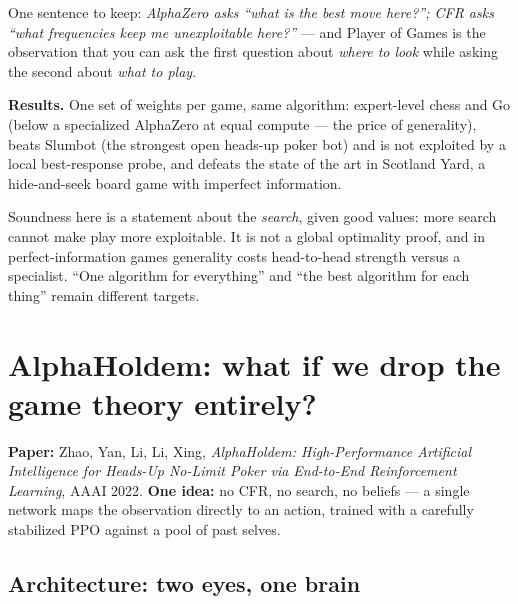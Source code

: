 \documentclass[11pt,a4paper]{article}
\begin{document}
\begin{intuition}
One sentence to keep: \emph{AlphaZero asks ``what is the best move here?'';
CFR asks ``what frequencies keep me unexploitable here?''} --- and Player of
Games is the observation that you can ask the first question about
\emph{where to look} while asking the second about \emph{what to play}.
\end{intuition}

\textbf{Results.} One set of weights per game, same algorithm: expert-level
chess and Go (below a specialized AlphaZero at equal compute --- the price of
generality), beats Slumbot (the strongest open heads-up poker bot) and is not
exploited by a local best-response probe, and defeats the state of the art in
Scotland Yard, a hide-and-seek board game with imperfect information.

\begin{trap}
Soundness here is a statement about the \emph{search}, given good values:
more search cannot make play more exploitable. It is not a global optimality
proof, and in perfect-information games generality costs head-to-head strength
versus a specialist. ``One algorithm for everything'' and ``the best algorithm
for each thing'' remain different targets.
\end{trap}

\section{AlphaHoldem: what if we drop the game theory entirely?}

\textbf{Paper:} Zhao, Yan, Li, Li, Xing, \emph{AlphaHoldem: High-Performance
Artificial Intelligence for Heads-Up No-Limit Poker via End-to-End
Reinforcement Learning}, AAAI 2022. \quad
\textbf{One idea:} no CFR, no search, no beliefs --- a single network maps the
observation directly to an action, trained with a carefully stabilized PPO
against a pool of past selves.

\subsection{Architecture: two eyes, one brain}
\end{document}
